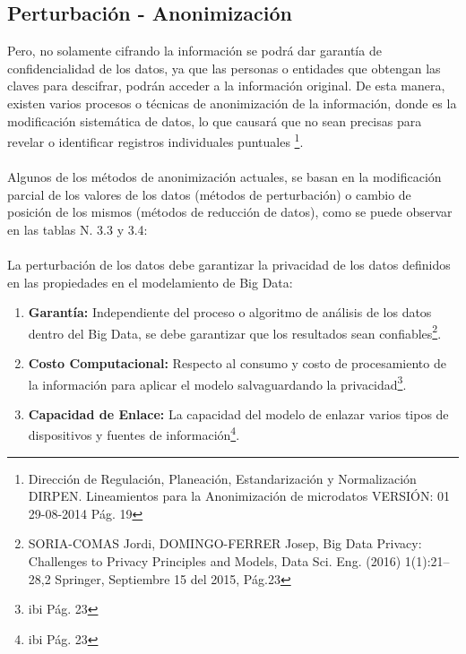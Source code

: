 \documentclass[a4paper,openright,12pt]{book}
\theoremstyle{definition}
\theoremstyle{remark}
\begin{document}
    \subsection{Perturbación - Anonimización}
   Pero, no solamente cifrando la información se podrá dar garantía de confidencialidad de los datos, ya que las personas o entidades que obtengan las claves para descifrar, podrán acceder a la información original. De esta manera, existen varios procesos o técnicas de anonimización de la información, donde es la modificación sistemática de datos, lo que causará que no sean precisas para revelar o identificar registros individuales puntuales \footnote{Dirección de Regulación, Planeación, Estandarización y Normalización DIRPEN. Lineamientos para
la Anonimización de microdatos VERSIÓN: 01 29-08-2014 Pág. 19}.\\\\
Algunos de los métodos de anonimización actuales, se basan en la modificación parcial de los valores de los datos (métodos de perturbación) o cambio de posición de los mismos (métodos de reducción de datos), como se puede observar en las tablas N. 3.3 y 3.4:\\\\
La perturbación de los datos debe garantizar la privacidad de los datos definidos en las propiedades en el modelamiento de Big Data:
\begin{enumerate}
	\item \textbf{Garantía:} Independiente del proceso o algoritmo de análisis de los datos dentro del Big Data, se debe garantizar que los resultados sean confiables\footnote{SORIA-COMAS Jordi, DOMINGO-FERRER Josep, 
Big Data Privacy: Challenges to Privacy Principles and Models, Data Sci. Eng. (2016) 1(1):21–28,2 Springer, Septiembre 15 del 2015, Pág.23}.
	\item \textbf{Costo Computacional:} Respecto al consumo y costo de procesamiento de la información para aplicar el modelo salvaguardando la privacidad\footnote{ibi Pág. 23}.
	\item \textbf{Capacidad de Enlace:} La capacidad del modelo de enlazar varios tipos de dispositivos y fuentes de información\footnote{ibi Pág. 23}.
\end{enumerate}
\end{document}

